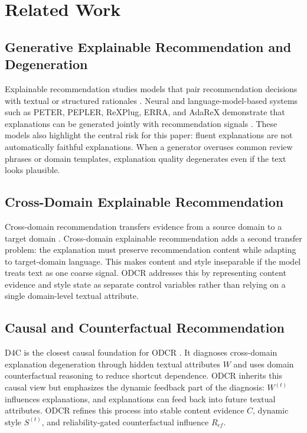 \section{Related Work}

\subsection{Generative Explainable Recommendation and Degeneration}

Explainable recommendation studies models that pair recommendation decisions
with textual or structured rationales \cite{explainable_rec_survey}. Neural
and language-model-based systems such as PETER, PEPLER, ReXPlug, ERRA, and
AdaReX demonstrate that explanations can be generated jointly with
recommendation signals \cite{peter,pepler,rexplug,erra,adarex}. These models
also highlight the central risk for this paper: fluent explanations are not
automatically faithful explanations. When a generator overuses common review
phrases or domain templates, explanation quality degenerates even if the text
looks plausible.

\subsection{Cross-Domain Explainable Recommendation}

Cross-domain recommendation transfers evidence from a source domain to a
target domain \cite{crossdomain_survey}. Cross-domain explainable
recommendation adds a second transfer problem: the explanation must preserve
recommendation content while adapting to target-domain language. This makes
content and style inseparable if the model treats text as one coarse signal.
ODCR addresses this by representing content evidence and style state as
separate control variables rather than relying on a single domain-level
textual attribute.

\subsection{Causal and Counterfactual Recommendation}

D4C is the closest causal foundation for ODCR \cite{d4c}. It diagnoses
cross-domain explanation degeneration through hidden textual attributes \(W\)
and uses domain counterfactual reasoning to reduce shortcut dependence. ODCR
inherits this causal view but emphasizes the dynamic feedback part of the
diagnosis: \(W^{(t)}\) influences explanations, and explanations can feed back
into future textual attributes. ODCR refines this process into stable content
evidence \(C\), dynamic style \(S^{(t)}\), and reliability-gated
counterfactual influence \(R_{cf}\).

